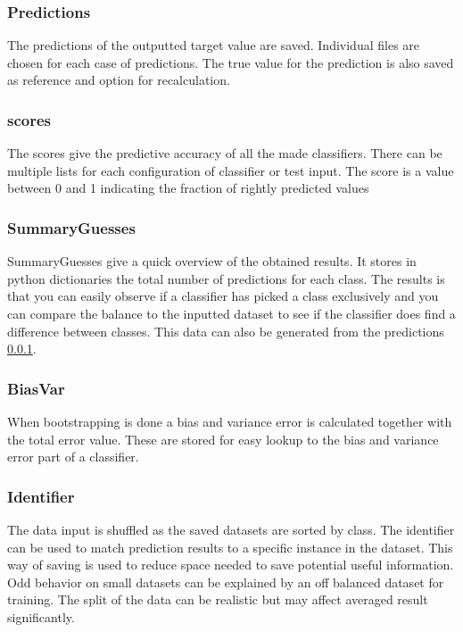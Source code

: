 \documentclass[a4paper,10pt]{article}
\begin{document}
\subsubsection{Predictions}\label{pred}
The predictions of the outputted target value are saved. Individual files are chosen for each case of predictions. The true value for the prediction is also saved as reference and option for recalculation. 

\subsubsection{scores}
The scores give the predictive accuracy of all the made classifiers. There can be multiple lists for each configuration of classifier or test input. The score is a value between 0 and 1 indicating the fraction of rightly predicted values

\subsubsection{SummaryGuesses}
SummaryGuesses give a quick overview of the obtained results. It stores in python dictionaries the total number of predictions for each class. The results is that you can easily observe if a classifier has picked a class exclusively and you can compare the balance to the inputted dataset to see if the classifier does find a difference between classes. This data can also be generated from the predictions \ref{pred}.

\subsubsection{BiasVar}
When bootstrapping is done a bias and variance error is calculated together with the total error value. These are stored for easy lookup to the bias and variance error part of a classifier.

\subsubsection{Identifier}
The data input is shuffled as the saved datasets are sorted by class. The identifier can be used to match prediction results to a specific instance in the dataset. This way of saving is used to reduce space needed to save potential useful information. Odd behavior on small datasets can be explained by an off balanced dataset for training. The split of the data can be realistic but may affect averaged result significantly. 
\end{document}
